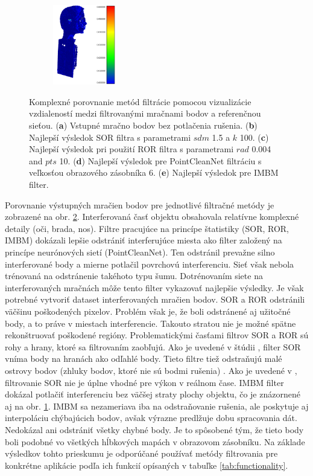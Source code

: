 \begin{figure}[H]
\begin{subfigure}[b]{0.19\textwidth}
		\centering
		\includegraphics[height=3.5cm]{figures/imbm_best.png}
		\caption{}
		\label{fig:best:e}
	\end{subfigure}
	\caption{Komplexné porovnanie metód filtrácie pomocou vizualizácie vzdialeností medzi filtrovanými mračnami bodov a referenčnou sieťou. (\textbf{a}) Vstupné mračno bodov bez potlačenia rušenia. (\textbf{b}) Najlepší výsledok SOR filtra s parametrami $sdm$ 1.5 a $k$ 100. (\textbf{c}) Najlepší výsledok pri použití ROR filtra s parametrami $rad$ 0.004 and $pts$ 10. (\textbf{d}) Najlepší výsledok pre PointCleanNet filtráciu s veľkosťou obrazového zásobníka 6. (\textbf{e}) Najlepší výsledok pre IMBM filter.}
	\label{fig:best}
\end{figure}

Porovnanie výstupných mračien bodov pre jednotlivé filtračné metódy je zobrazené na obr. \ref{fig:best}. Interferovaná časť objektu obsahovala relatívne komplexné detaily (oči, brada, nos). Filtre pracujúce na princípe štatistiky (SOR, ROR, IMBM) dokázali lepšie odstrániť interferujúce miesta ako filter založený na princípe neurónových sietí (PointCleanNet). Ten odstránil prevažne silno interferované body a mierne potlačil povrchovú interferenciu. Sieť však nebola trénovaná na odstránenie takéhoto typu šumu. Dotrénovaním siete na interferovaných mračnách môže tento filter vykazovať najlepšie výsledky. Je však potrebné vytvoriť dataset interferovaných mračien bodov. SOR a ROR odstránili väčšinu poškodených pixelov. Problém však je, že boli odstránené aj užitočné body, a to práve v miestach interferencie. Takouto stratou nie je možné spätne rekonštruovať poškodené regióny. Problematickými časťami filtrov SOR a ROR sú rohy a hrany, ktoré sa filtrovaním zaobľujú. Ako je uvedené v štúdii \cite{Pirotti}, filter SOR vníma body na hranách ako odľahlé body. Tieto filtre tiež odstraňujú malé ostrovy bodov (zhluky bodov, ktoré nie sú bodmi rušenia) \cite{Schaller}. Ako je uvedené v \cite{Balta}, filtrovanie SOR nie je úplne vhodné pre výkon v reálnom čase. IMBM filter dokázal potlačiť interferenciu bez väčšej straty plochy objektu, čo je znázornené aj na obr. \ref{fig:best:e}. IMBM sa nezameriava iba na odstraňovanie rušenia, ale poskytuje aj interpoláciu chýbajúcich bodov, avšak výrazne predlžuje dobu spracovania dát.  Nedokázal ani odstrániť všetky chybné body. Je to spôsobené tým, že tieto body boli podobné vo všetkých hĺbkových mapách v obrazovom zásobníku. Na základe výsledkov tohto prieskumu je odporúčané používať metódy filtrovania pre konkrétne aplikácie podľa ich funkcií opísaných v tabuľke \ref{tab:functionality}.

